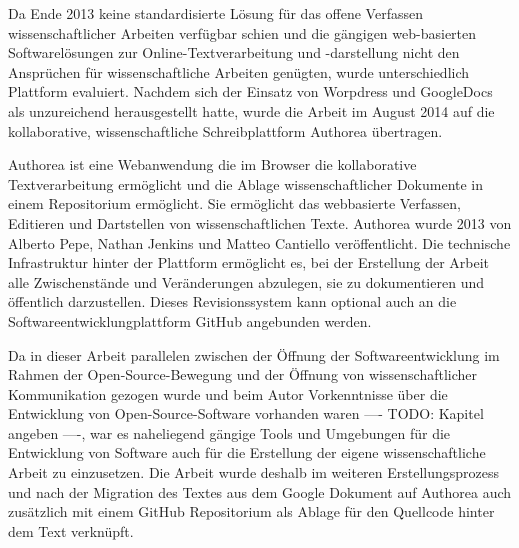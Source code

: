 Da Ende 2013 keine standardisierte Lösung für das offene Verfassen wissenschaftlicher Arbeiten verfügbar schien und die gängigen web-basierten Softwarelösungen zur Online-Textverarbeitung und -darstellung nicht den Ansprüchen für wissenschaftliche Arbeiten genügten, wurde unterschiedlich Plattform evaluiert. Nachdem sich der Einsatz von Worpdress und GoogleDocs als unzureichend herausgestellt hatte, wurde die Arbeit im August 2014 auf die kollaborative, wissenschaftliche Schreibplattform Authorea übertragen.

Authorea ist eine Webanwendung die im Browser die kollaborative Textverarbeitung ermöglicht und die Ablage wissenschaftlicher Dokumente in einem Repositorium ermöglicht. Sie ermöglicht das webbasierte Verfassen, Editieren und Dartstellen von wissenschaftlichen Texte. Authorea wurde 2013 von Alberto Pepe, Nathan Jenkins und Matteo Cantiello veröffentlicht. Die technische Infrastruktur hinter der Plattform ermöglicht es, bei der Erstellung der Arbeit alle Zwischenstände und Veränderungen abzulegen, sie zu dokumentieren und öffentlich darzustellen. Dieses Revisionssystem kann optional auch an die Softwareentwicklungplattform GitHub angebunden werden.

Da in dieser Arbeit parallelen zwischen der Öffnung der Softwareentwicklung im Rahmen der Open-Source-Bewegung und der Öffnung von wissenschaftlicher Kommunikation gezogen wurde und beim Autor Vorkenntnisse über die Entwicklung von Open-Source-Software vorhanden waren ---- TODO: Kapitel angeben ----, war es naheliegend gängige Tools und Umgebungen für die Entwicklung von Software auch für die Erstellung der eigene wissenschaftliche Arbeit zu einzusetzen. Die Arbeit wurde deshalb im weiteren Erstellungsprozess und nach der Migration des Textes aus dem Google Dokument auf Authorea auch zusätzlich mit einem GitHub Repositorium als Ablage für den Quellcode hinter dem Text verknüpft.

